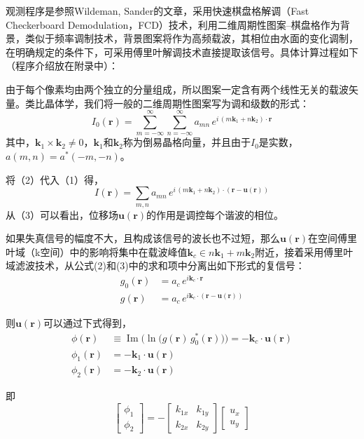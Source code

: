 \documentclass[11pt,a4paper]{ctexart}
\begin{document}
观测程序是参照Wildeman, Sander的文章\cite{Wildeman2018}，采用快速棋盘格解调（Fast Checkerboard Demodulation，FCD）技术，利用二维周期性图案--棋盘格作为背景，类似于频率调制技术，背景图案将作为高频载波，其相位由水面的变化调制，在明确规定的条件下，可采用傅里叶解调技术直接提取该信号。具体计算过程如下（程序介绍放在附录中）：

由于每个像素均由两个独立的分量组成，所以图案一定含有两个线性无关的载波矢量。类比晶体学，我们将一般的二维周期性图案写为调和级数的形式：
\begin{equation}
I_0(\bm{r})
= \sum_{m=-\infty}^{\infty}
  \sum_{n=-\infty}^{\infty}
  a_{mn}\,
  e^{i\,(m\bm{k}_1 + n\bm{k}_2)\cdot\bm{r}}
\end{equation}
其中，$\bm{k}_1 \times \bm{k}_2 \neq 0$，$\bm{k}_1$和$\bm{k}_2$称为倒易晶格向量，并且由于$I_0$是实数，$a(m, n) = a^*(-m, -n)$。


将（2）代入（1）得，
\begin{equation}
I(\bm{r})
= \sum_{m,n}
  a_{mn}\,
  e^{i\,(m\bm{k}_1 + n\bm{k}_2)\cdot(\bm{r}-\bm{u}(\bm{r}))}
\end{equation}
从（3）可以看出，位移场$\bm{u(r)}$的作用是调控每个谐波的相位。

如果失真信号的幅度不大，且构成该信号的波长也不过短，那么$\bm{u(r)}$在空间傅里叶域（k空间）中的影响将集中在载波峰值$\bm{k}_c \in n\bm{k}_1 +m\bm{k}_2$附近，接着采用傅里叶域滤波技术，从公式(2)和(3)中的求和项中分离出如下形式的复信号：
\begin{align}
g_0(\bm{r}) & = a_c\, e^{i\bm{k}_c\cdot\bm{r}} \\
g(\bm{r}) & = a_c\, e^{i\bm{k}_c\cdot(\bm{r}-\bm{u}(\bm{r}))}
\end{align}

则$\bm{u(r)}$可以通过下式得到， 
\begin{align}
\phi(\bm{r})
& \equiv \operatorname{Im}\!\bigl(
  \ln\bigl(g(\bm{r})\,g_0^*(\bm{r})\bigr)
\bigr)
= -\bm{k}_c\cdot\bm{u}(\bm{r}) \\
\phi_1(\mathbf{r}) &= -\mathbf{k}_1\cdot\mathbf{u}(\mathbf{r}) \\
\phi_2(\mathbf{r}) &= -\mathbf{k}_2\cdot\mathbf{u}(\mathbf{r})
\end{align}

即
\begin{equation}
\begin{bmatrix}
\phi_1 \\[4pt]
\phi_2
\end{bmatrix}
=
-
\begin{bmatrix}
k_{1x} & k_{1y} \\[4pt]
k_{2x} & k_{2y}
\end{bmatrix}
\begin{bmatrix}
u_x \\[4pt]
u_y
\end{bmatrix}
\end{equation}
\end{document}
